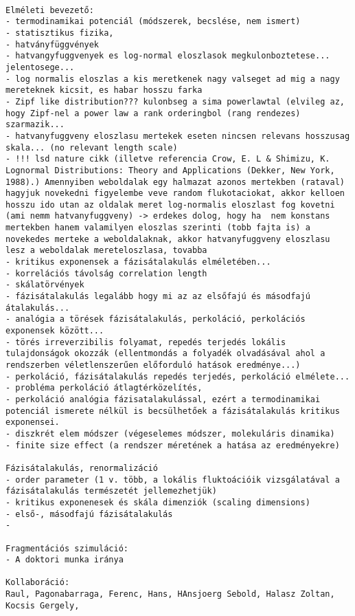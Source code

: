 \begin{verbatim}
	
Elméleti bevezető:
- termodinamikai potenciál (módszerek, becslése, nem ismert)
- statisztikus fizika, 
- hatványfüggvények	
- hatvangyfuggvenyek es log-normal eloszlasok megkulonboztetese... jelentosege...
- log normalis eloszlas a kis meretkenek nagy valseget ad mig a nagy mereteknek kicsit, es habar hosszu farka
- Zipf like distribution??? kulonbseg a sima powerlawtal (elvileg az, hogy Zipf-nel a power law a rank orderingbol (rang rendezes) szarmazik...
- hatvanyfuggveny eloszlasu mertekek eseten nincsen relevans hosszusag skala... (no relevant length scale)
- !!! lsd nature cikk (illetve referencia Crow, E. L & Shimizu, K. Lognormal Distributions: Theory and Applications (Dekker, New York, 1988).) Amennyiben weboldalak egy halmazat azonos mertekben (rataval) hagyjuk novekedni figyelembe veve random flukotaciokat, akkor kelloen hosszu ido utan az oldalak meret log-normalis eloszlast fog kovetni (ami nemm hatvanyfuggveny) -> erdekes dolog, hogy ha  nem konstans mertekben hanem valamilyen eloszlas szerinti (tobb fajta is) a novekedes merteke a weboldalaknak, akkor hatvanyfuggveny eloszlasu lesz a weboldalak mereteloszlasa, tovabba 
- kritikus exponensek a fázisátalakulás elméletében...
- korrelációs távolság correlation length
- skálatörvények
- fázisátalakulás legalább hogy mi az az elsőfajú és másodfajú átalakulás...	
- analógia a törések fázisátalakulás, perkoláció, perkolációs exponensek között... 
- törés irreverzibilis folyamat, repedés terjedés lokális tulajdonságok okozzák (ellentmondás a folyadék olvadásával ahol a rendszerben véletlenszerűen előforduló hatások eredménye...)
- perkoláció, fázisátalakulás repedés terjedés, perkoláció elmélete...
- probléma perkoláció átlagtérközelítés,
- perkoláció analógia fázisatalakulással, ezért a termodinamikai potenciál ismerete nélkül is becsülhetőek a fázisátalakulás kritikus exponensei. 
- diszkrét elem módszer (végeselemes módszer, molekuláris dinamika)
- finite size effect (a rendszer méretének a hatása az eredményekre)

Fázisátalakulás, renormalizáció
- order parameter (1 v. több, a lokális fluktoációik vizsgálatával a fázisátalakulás természetét jellemezhetjük)
- kritikus exponenesek és skála dimenziók (scaling dimensions)
- első-, másodfajú fázisátalakulás
- 

Fragmentációs szimuláció:
- A doktori munka iránya 

Kollaboráció:
Raul, Pagonabarraga, Ferenc, Hans, HAnsjoerg Sebold, Halasz Zoltan, Kocsis Gergely,
	

\end{verbatim}
